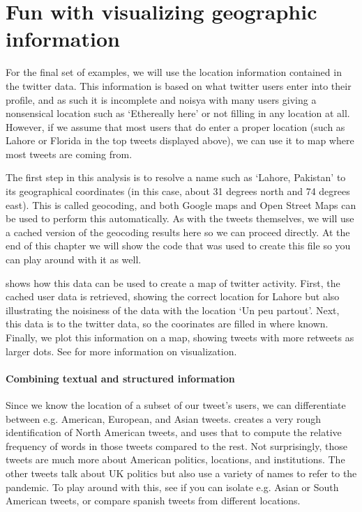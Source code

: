 
\section{Fun with visualizing geographic information}
For the final set of examples, we will use the location information contained in the twitter data.
This information is based on what twitter users enter into their profile, and as such it is incomplete and noisya
with many users giving a nonsensical location such as `Ethereally here' or not filling in any location at all.
However, if we assume that most users that do enter a proper location (such as Lahore or Florida in the top tweets displayed above),
we can use it to map where most tweets are coming from.

The first step in this analysis is to resolve a name such as `Lahore, Pakistan' to its geographical coordinates (in this case, about 31 degrees north and 74 degrees east). This is called geocoding, and both Google maps and Open Street Maps can be used
to perform this automatically.
As with the tweets themselves, we will use a cached version of the geocoding results here so we can proceed directly.
At the end of this chapter we will show the code that was used to create this file so you can play around with it as well. 

 shows how this data can be used to create a map of twitter activity.
First, the cached user data is retrieved, showing the correct location for Lahore but also
illustrating the noisiness of the data with the location `Un peu partout'.
Next, this data is  to the twitter data, so the coorinates are filled in where known.
Finally, we plot this information on a map, showing tweets with more retweets as larger dots.
See  for more information on visualization.



\paragraph{Combining textual and structured information}
Since we know the location of a subset of our tweet's users,
we can differentiate between e.g. American, European, and Asian tweets.
 creates a very rough identification of North American tweets,
and uses that to compute the relative frequency of words in those tweets compared to the rest.
Not surprisingly, those tweets are much more about American politics, locations, and institutions.
The other tweets talk about UK politics but also use a variety of names to refer to the pandemic.
To play around with this, see if you can isolate e.g. Asian or South American tweets,
or compare spanish tweets from different locations.


